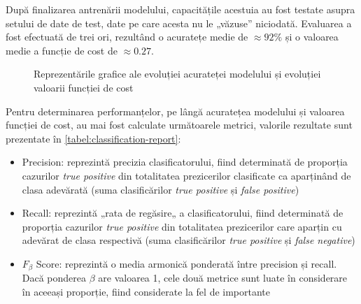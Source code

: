 După finalizarea antrenării modelului, capacitățile acestuia au fost testate asupra setului de date de test, date pe care acesta nu le „văzuse” niciodată. Evaluarea a fost efectuată de trei ori, rezultând o acuratețe medie de $\approx92\%$ și o valoarea medie a funcție de cost de $\approx0.27$.
\begin{figure}[H]
\centering
{}
\qquad
{}
\caption{Reprezentările grafice ale evoluției acurateței modelului \protect{} și evoluției valoarii funcției de cost \protect{}}\label{fig:acc+loss+graph}
\end{figure}

Pentru determinarea performanțelor, pe lângă acuratețea modelului și valoarea funcției de cost, au mai fost calculate următoarele metrici, valorile rezultate sunt prezentate în \autoref{tabel:classification-report}:
\begin{itemize}
\item Precision: reprezintă precizia clasificatorului, fiind determinată de proporția cazurilor \textit{true positive} din totalitatea prezicerilor clasificate ca aparținând de clasa adevărată (suma clasificărilor \textit{true positive} și \textit{false positive})
\item Recall: reprezintă „rata de regăsire„ a clasificatorului, fiind determinată de proporția cazurilor \textit{true positive} din totalitatea prezicerilor care aparțin cu adevărat de clasa respectivă (suma clasificărilor \textit{true positive} și \textit{false negative})
\item $F_\beta$ Score: reprezintă o media armonică ponderată între precision și recall. Dacă ponderea $\beta$ are valoarea 1, cele două metrice sunt luate în considerare în aceeași proporție, fiind considerate la fel de importante
\end{itemize}

